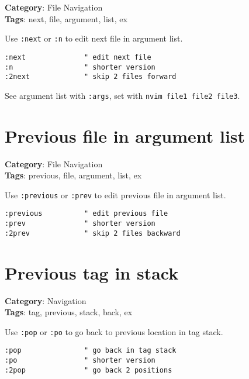 {{{{{{\textbf{Category}: File Navigation\\ \textbf{Tags}: next, file, argument, list, ex
\vspace{0.5cm}

Use {\footnotesize \Verb§:next§} or {\footnotesize \Verb§:n§} to edit next file in argument list.

\begin{Exa*}{}
\begin{Verbatim}[fontsize=\footnotesize, breaklines, breakanywhere]
:next              " edit next file
:n                 " shorter version
:2next             " skip 2 files forward
\end{Verbatim}
\end{Exa*}

See argument list with {\footnotesize \Verb§:args§}, set with {\footnotesize \Verb§nvim file1 file2 file3§}.

\section{Previous file in argument list}

\textbf{Category}: File Navigation\\ \textbf{Tags}: previous, file, argument, list, ex
\vspace{0.5cm}

Use {\footnotesize \Verb§:previous§} or {\footnotesize \Verb§:prev§} to edit previous file in argument list.

\begin{Exa*}{}
\begin{Verbatim}[fontsize=\footnotesize, breaklines, breakanywhere]
:previous          " edit previous file  
:prev              " shorter version
:2prev             " skip 2 files backward
\end{Verbatim}
\end{Exa*}

\section{Previous tag in stack}

\textbf{Category}: Navigation\\ \textbf{Tags}: tag, previous, stack, back, ex
\vspace{0.5cm}

Use {\footnotesize \Verb§:pop§} or {\footnotesize \Verb§:po§} to go back to previous location in tag stack.

\begin{Exa*}{}
\begin{Verbatim}[fontsize=\footnotesize, breaklines, breakanywhere]
:pop               " go back in tag stack
:po                " shorter version
:2pop              " go back 2 positions
\end{Verbatim}
\end{Exa*}

}}}}}}

